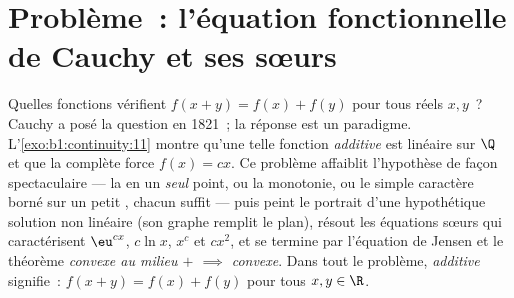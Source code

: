 \section{Problème~: l'équation fonctionnelle de Cauchy et ses sœurs}

\begin{problem}[{Devoir maison --- $f(x + y) = f(x) + f(y)$~:
la régularité force la linéarité, et le portrait des monstres}]
\label{pb:b1:continuity:1}
Quelles fonctions vérifient $f(x + y) = f(x) + f(y)$ pour tous
réels $x, y$~? Cauchy a posé la question en 1821~; la réponse est
un paradigme. L'\cref{exo:b1:continuity:11} montre qu'une telle
fonction \emph{additive} est linéaire sur $\Q$ et que la
 complète force $f(x) = cx$. Ce problème affaiblit
l'hypothèse de façon spectaculaire --- la  en un
\emph{seul} point, ou la monotonie, ou le simple caractère borné
sur un petit , chacun suffit --- puis peint le portrait
d'une hypothétique solution non linéaire (son graphe remplit le
plan), résout les équations sœurs qui caractérisent $\eu^{cx}$,
$c\ln x$, $x^c$ et $cx^2$, et se termine par l'équation de Jensen
et le théorème \emph{convexe au milieu $+$  $\implies$
convexe}. Dans tout le problème,
\emph{additive} signifie~: $f(x + y) = f(x) + f(y)$ pour tous $x,
y \in \R$.


\end{problem}
